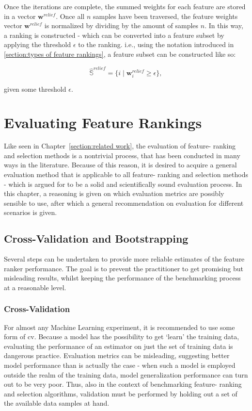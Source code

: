 \documentclass{article}
\begin{document}
Once the iterations are complete, the summed weights for each feature are stored in a vector $\boldsymbol{w}^{relief}$. Once all $n$ samples have been traversed, the feature weights vector $\boldsymbol{w}^{relief}$ is normalized by dividing by the amount of samples $n$. In this way, a ranking is constructed - which can be converted into a feature subset by applying the threshold $\epsilon$ to the ranking. i.e., using the notation introduced in \ref{section:types of feature rankings}, a feature subset can be constructed like so:

\begin{equation}
\hat{\mathbb{S}}^{relief} = \{ i \mid \boldsymbol{w}^{relief}_i \geq \epsilon \},
\end{equation}

given some threshold $\epsilon$.
    
\section{Evaluating Feature Rankings}\label{section:evaluating feature rankings}
Like seen in Chapter~\ref{section:related work}, the evaluation of feature- ranking and selection methods is a nontrivial process, that has been conducted in many ways in the literature. Because of this reason, it is desired to acquire a general evaluation method that is applicable to all feature- ranking and selection methods - which is argued for to be a solid and scientifically sound evaluation process. In this chapter, a reasoning is given on which evaluation metrics are possibly sensible to use, after which a general recommendation on evaluation for different scenarios is given.

\subsection{Cross-Validation and Bootstrapping}\label{section:cv}
Several steps can be undertaken to provide more reliable estimates of the feature ranker performance. The goal is to prevent the practitioner to get promising but misleading results, whilst keeping the performance of the benchmarking process at a reasonable level.

\subsubsection{Cross-Validation}
For almost any Machine Learning experiment, it is recommended to use some form of \gls{cv}. Because a model has the possibility to get `learn' the training data, evaluating the performance of an estimator on just the set of training data is dangerous practice. Evaluation metrics can be misleading, suggesting better model performance than is actually the case - when such a model is employed outside the realm of the training data, model generalization performance can turn out to be very poor. Thus, also in the context of benchmarking feature- ranking and selection algorithms, validation must be performed by holding out a set of the available data samples at hand.
\end{document}
